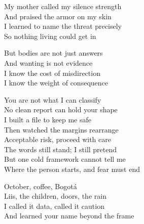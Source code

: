 \begin{lyrics}
My mother called my silence strength\\
And praised the armor on my skin\\
I learned to name the threat precisely\\
So nothing living could get in

But bodies are not just answers\\
And wanting is not evidence\\
I know the cost of misdirection\\
I know the weight of consequence

You are not what I can classify\\
No clean report can hold your shape\\
I built a file to keep me safe\\
Then watched the margins rearrange\\
Acceptable risk, proceed with care\\
The words still stand; I still pretend\\
But one cold framework cannot tell me\\
Where the person starts, and fear must end

October, coffee, Bogotá\\
Liis, the children, doors, the rain\\
I called it data, called it caution\\
And learned your name beyond the frame
\end{lyrics}

